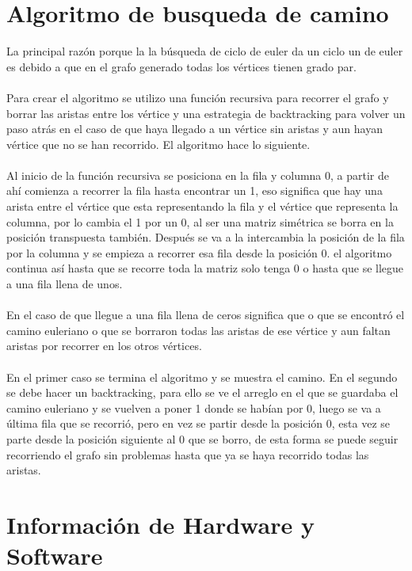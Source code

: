 \documentclass[12pt,letterpaper]{scrartcl}
\begin{document}
\section{Algoritmo de busqueda de camino}

La principal razón porque la la búsqueda de ciclo de euler da un ciclo un de euler es debido a que en el grafo generado todas los vértices tienen grado par.
\\\\
Para crear el algoritmo se utilizo una función recursiva para recorrer el grafo y borrar las aristas entre los vértice y una estrategia de backtracking para volver un paso atrás en el caso de que haya llegado a un vértice sin aristas y aun hayan vértice que no se han recorrido. El algoritmo hace lo siguiente.
\\\\
Al inicio de la función recursiva se posiciona en la fila y columna 0, a partir de ahí comienza a recorrer la fila hasta encontrar un 1, eso significa que hay una arista entre el vértice que esta representando la fila y el vértice que representa la columna, por lo cambia el 1 por un 0, al ser una matriz simétrica se borra en la posición transpuesta también. Después se va a la intercambia la posición de la fila por la columna y se empieza a recorrer esa fila desde la posición 0. el algoritmo continua así hasta que se recorre toda la matriz solo tenga 0 o hasta que se llegue a una fila llena de unos.
\\\\
En el caso de que llegue a una fila llena de ceros significa que o que se encontró el camino euleriano o que se borraron todas las aristas de ese vértice y aun faltan aristas por recorrer en los otros vértices.
\\\\
En el primer caso se termina el algoritmo y se muestra el camino. En el segundo se debe hacer un backtracking, para ello se ve el arreglo en el que se guardaba el camino euleriano y se vuelven a poner 1 donde se habían por 0, luego se va a última fila que se recorrió, pero en vez se partir desde la posición 0, esta vez se parte desde la posición siguiente al 0 que se borro, de esta forma se puede seguir recorriendo el grafo sin problemas hasta que ya se haya recorrido todas las aristas.






\section{Información de Hardware y Software}
\end{document}
